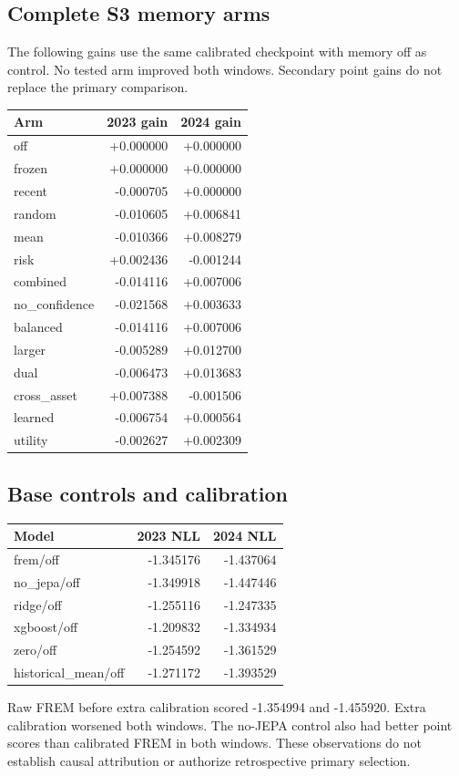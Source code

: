 \subsection{Complete S3 memory arms}
The following gains use the same calibrated checkpoint with memory off as control. No tested arm improved both windows. Secondary point gains do not replace the primary comparison.
\begin{center}
\begin{tabular}{lrr}
\toprule
Arm & 2023 gain & 2024 gain \\
\midrule
off & +0.000000 & +0.000000 \\
frozen & +0.000000 & +0.000000 \\
recent & -0.000705 & +0.000000 \\
random & -0.010605 & +0.006841 \\
mean & -0.010366 & +0.008279 \\
risk & +0.002436 & -0.001244 \\
combined & -0.014116 & +0.007006 \\
no\_confidence & -0.021568 & +0.003633 \\
balanced & -0.014116 & +0.007006 \\
larger & -0.005289 & +0.012700 \\
dual & -0.006473 & +0.013683 \\
cross\_asset & +0.007388 & -0.001506 \\
learned & -0.006754 & +0.000564 \\
utility & -0.002627 & +0.002309 \\
\bottomrule
\end{tabular}
\end{center}
\subsection{Base controls and calibration}
\begin{center}
\begin{tabular}{lrr}
\toprule
Model & 2023 NLL & 2024 NLL \\
\midrule
frem/off & -1.345176 & -1.437064 \\
no\_jepa/off & -1.349918 & -1.447446 \\
ridge/off & -1.255116 & -1.247335 \\
xgboost/off & -1.209832 & -1.334934 \\
zero/off & -1.254592 & -1.361529 \\
historical\_mean/off & -1.271172 & -1.393529 \\
\bottomrule
\end{tabular}
\end{center}
Raw FREM before extra calibration scored -1.354994 and -1.455920. Extra calibration worsened both windows. The no-JEPA control also had better point scores than calibrated FREM in both windows. These observations do not establish causal attribution or authorize retrospective primary selection.
